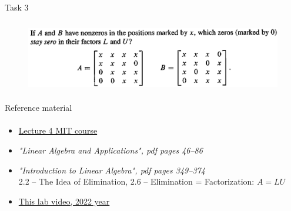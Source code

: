 \documentclass[aspectratio=169,notes]{beamer}
\newcommand{\fbckg}[1]{\usebackgroundtemplate{\texttt{[image: \#1]}}}%
\begin{document}
\begin{frame}[t]{Task 3}
    \framesubtitle{}
    \begin{figure}[H]
        \centering\includegraphics[height=3cm,width=1\textwidth,keepaspectratio]{3.png}
        \label{fig:3.png}
    \end{figure}
\end{frame}

\begin{frame}[t]{Reference material}
    \framesubtitle{}
    \Large
    \begin{itemize}
        \item \href{https://ocw.mit.edu/courses/mathematics/18-06-linear-algebra-spring-2010/video-lectures/lecture-4-factorization-into-a-lu/}{Lecture 4 MIT course}
        \item \textit{"Linear Algebra and Applications", pdf pages 46--86 }
        \item \textit{"Introduction to Linear Algebra", pdf pages 349--374 }\\  2.2 -- The Idea of Elimination, 2.6 -- Elimination = Factorization: $A=LU$
        \item \href{https://youtu.be/OJPX6wINxBU}{This lab video, 2022 year}
    \end{itemize}
\end{frame}

\fbckg{fibeamer/figs/last_page.png}
\frame[plain]{}
\end{document}
